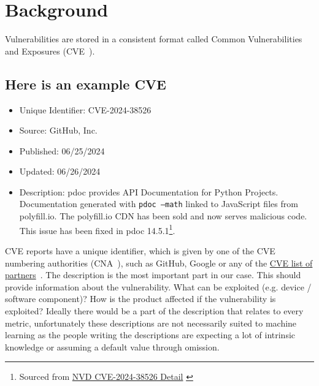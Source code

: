 \section{Background} \label{sec:background}

Vulnerabilities are stored in a consistent format called Common Vulnerabilities and Exposures (CVE~\cite{CVE}).

\subsection{Here is an example CVE}
\begin{itemize}
	\item   Unique Identifier: CVE-2024-38526
	\item   Source: GitHub, Inc.
	\item   Published: 06/25/2024
	\item   Updated: 06/26/2024
	\item   Description: pdoc provides API Documentation for Python Projects. Documentation generated with \texttt{pdoc --math} linked to JavaScript files from polyfill.io. The polyfill.io CDN has been sold and now serves malicious code. This issue has been fixed in pdoc 14.5.1\footnote{ Sourced from \href{https://nvd.nist.gov/vuln/detail/CVE-2024-38526}{NVD CVE-2024-38526 Detail} \cite{polyfill}}. \\

\end{itemize}

\bigskip


CVE reports have a unique identifier, which is given by one of the CVE numbering authorities
(CNA~\cite{CNA}), such as GitHub, Google or any of the
\href{https://www.cve.org/PartnerInformation/ListofPartners}{CVE list of partners}~\cite{partners}.
The description is the most important part in our case. This should provide information about the
vulnerability. What can be exploited (e.g. device / software component)? How is the product affected if the vulnerability is exploited? Ideally there would be a part of the description that relates to every metric, unfortunately these descriptions are not necessarily suited to machine learning as the people writing the descriptions are expecting a lot of intrinsic knowledge or assuming a default value through omission.

